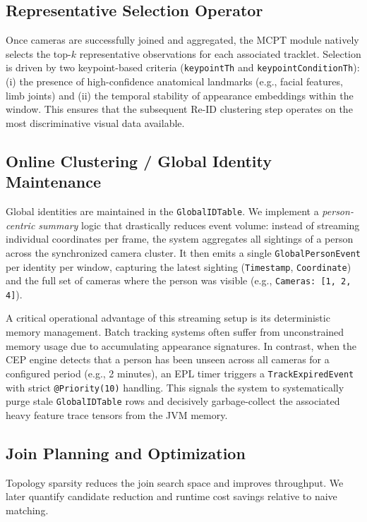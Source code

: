 \documentclass[11pt]{article}
\begin{document}
\subsection{Representative Selection Operator}
Once cameras are successfully joined and aggregated, the MCPT module natively selects the top-$k$ representative observations for each associated tracklet. Selection is driven by two keypoint-based criteria (\texttt{keypointTh} and \texttt{keypointConditionTh}): (i) the presence of high-confidence anatomical landmarks (e.g., facial features, limb joints) and (ii) the temporal stability of appearance embeddings within the window. This ensures that the subsequent Re-ID clustering step operates on the most discriminative visual data available.

\subsection{Online Clustering / Global Identity Maintenance}
Global identities are maintained in the \texttt{GlobalIDTable}. We implement a \textit{person-centric summary} logic that drastically reduces event volume: instead of streaming individual coordinates per frame, the system aggregates all sightings of a person across the synchronized camera cluster. It then emits a single \texttt{GlobalPersonEvent} per identity per window, capturing the latest sighting (\texttt{Timestamp}, \texttt{Coordinate}) and the full set of cameras where the person was visible (e.g., \texttt{Cameras: [1, 2, 4]}). 

A critical operational advantage of this streaming setup is its deterministic memory management. Batch tracking systems often suffer from unconstrained memory usage due to accumulating appearance signatures. In contrast, when the CEP engine detects that a person has been unseen across all cameras for a configured period (e.g., 2 minutes), an EPL timer triggers a \texttt{TrackExpiredEvent} with strict \texttt{@Priority(10)} handling. This signals the system to systematically purge stale \texttt{GlobalIDTable} rows and decisively garbage-collect the associated heavy feature trace tensors from the JVM memory.

\subsection{Join Planning and Optimization}
Topology sparsity reduces the join search space and improves throughput. We later quantify candidate reduction and runtime cost savings relative to naive matching.
\end{document}
